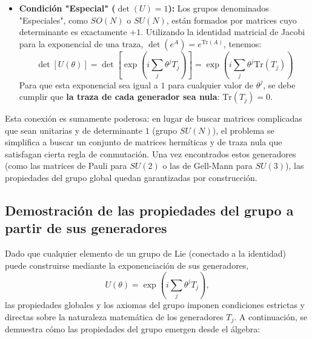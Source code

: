 \begin{itemize}
    \item \textbf{Condición "Especial" ($\det(U) = 1$):} Los grupos denominados "Especiales", como $SO(N)$ o $SU(N)$, están formados por matrices cuyo determinante es exactamente $+1$. Utilizando la identidad matricial de Jacobi para la exponencial de una traza, $\det(e^A) = e^{\text{Tr}(A)}$, tenemos:
    \begin{equation}
        \det[U(\theta)] = \det\left[ \exp\left(i \sum_j \theta^j T_j\right) \right] = \exp\left( i \sum_j \theta^j \text{Tr}(T_j) \right)
    \end{equation}
    Para que esta exponencial sea igual a $1$ para cualquier valor de $\theta^j$, se debe cumplir que \textbf{la traza de cada generador sea nula}: $\text{Tr}(T_j) = 0$.
\end{itemize}

Esta conexión es sumamente poderosa: en lugar de buscar matrices complicadas que sean unitarias y de determinante $1$ (grupo $SU(N)$), el problema se simplifica a buscar un conjunto de matrices hermíticas y de traza nula que satisfagan cierta regla de conmutación. Una vez encontrados estos generadores (como las matrices de Pauli para $SU(2)$ o las de Gell-Mann para $SU(3)$), las propiedades del grupo global quedan garantizadas por construcción.


\subsection{Demostración de las propiedades del grupo a partir de sus generadores}

Dado que cualquier elemento de un grupo de Lie (conectado a la identidad) puede construirse mediante la exponenciación de sus generadores, 
\begin{equation}
    U(\theta) = \exp\left(i \sum_j \theta^j T_j\right),
\end{equation}
las propiedades globales y los axiomas del grupo imponen condiciones estrictas y directas sobre la naturaleza matemática de los generadores $T_j$. A continuación, se demuestra cómo las propiedades del grupo emergen desde el álgebra:

